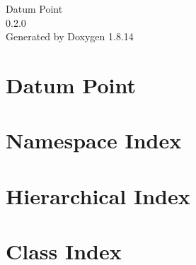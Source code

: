 \documentclass[twoside]{book}
\newcommand{\+}{\discretionary{\mbox{\scriptsize$\hookleftarrow$}}{}{}}
\newcommand{\clearemptydoublepage}{%
  \newpage{\pagestyle{empty}\cleardoublepage}%
}
\begin{document}
\hypersetup{pageanchor=false,
             bookmarksnumbered=true,
             pdfencoding=unicode
            }
\begin{titlepage}
\vspace*{7cm}
\begin{center}%
{\Large Datum Point \\[1ex]\large 0.\+2.\+0 }\\
\vspace*{1cm}
{\large Generated by Doxygen 1.8.14}\\
\end{center}
\end{titlepage}
\clearemptydoublepage
{}
\tableofcontents
\clearemptydoublepage
{}
\hypersetup{pageanchor=true}

\chapter{Datum Point}
\label{md__d_1__work__git_hub_datum-point__r_e_a_d_m_e}

\chapter{Namespace Index}

\chapter{Hierarchical Index}

\chapter{Class Index}

\end{document}
